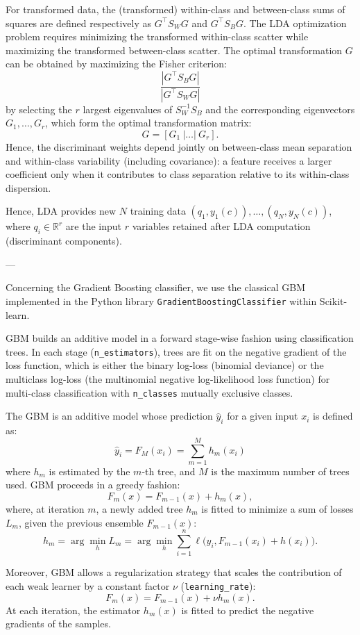 \documentclass[11pt,a4paper]{article}
\begin{document}
For transformed data, the (transformed) within-class and between-class sums of squares are defined respectively as $G^\top S_W G$ and $G^\top S_B G$.  
The LDA optimization problem requires minimizing the transformed within-class scatter while maximizing the transformed between-class scatter.  
The optimal transformation $G$ can be obtained by maximizing the Fisher criterion:
\[
\frac{|G^\top S_B G|}{|G^\top S_W G|}
\]
by selecting the $r$ largest eigenvalues of $S_W^{-1} S_B$ and the corresponding eigenvectors $G_1, \dots, G_r$, which form the optimal transformation matrix:
\[
G = [G_1 \ | \dots | \ G_r].
\]
Hence, the discriminant weights depend jointly on between-class mean separation and within-class variability (including covariance): a feature receives a larger coefficient only when it contributes to class separation relative to its within-class dispersion.

Hence, LDA provides new $N$ training data $(q_1, y_1(c)), \dots, (q_N, y_N(c))$, where $q_i \in \mathbb{R}^r$ are the input $r$ variables retained after LDA computation (discriminant components).

---

Concerning the Gradient Boosting classifier, we use the classical GBM \citep{friedman2001greedy} implemented in the Python library \texttt{GradientBoostingClassifier} within Scikit-learn.  

GBM builds an additive model in a forward stage-wise fashion using classification trees.  
In each stage (\texttt{n\_estimators}), trees are fit on the negative gradient of the loss function, which is either the binary log-loss (binomial deviance) or the multiclass log-loss (the multinomial negative log-likelihood loss function) for multi-class classification with \texttt{n\_classes} mutually exclusive classes.

The GBM is an additive model whose prediction $\hat{y}_i$ for a given input $x_i$ is defined as:
\[
\hat{y}_i = F_M(x_i) = \sum_{m=1}^M h_m(x_i) \tag{1}
\]
where $h_m$ is estimated by the $m$-th tree, and $M$ is the maximum number of trees used.  
GBM proceeds in a greedy fashion:
\[
F_m(x) = F_{m-1}(x) + h_m(x),
\]
where, at iteration $m$, a newly added tree $h_m$ is fitted to minimize a sum of losses $L_m$, given the previous ensemble $F_{m-1}(x)$:
\[
h_m = \arg \min_h L_m = \arg \min_h \sum_{i=1}^n \ell \Big(y_i, F_{m-1}(x_i) + h(x_i)\Big). \tag{2}
\]

Moreover, GBM allows a regularization strategy that scales the contribution of each weak learner by a constant factor $\nu$ (\texttt{learning\_rate}):
\[
F_m(x) = F_{m-1}(x) + \nu h_m(x).
\]
At each iteration, the estimator $h_m(x)$ is fitted to predict the negative gradients of the samples.
\end{document}
